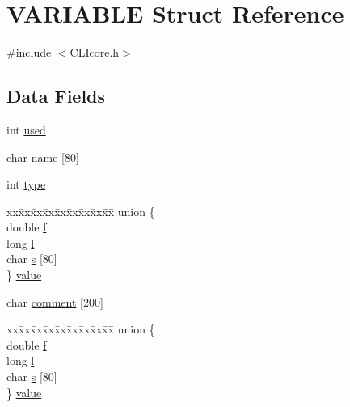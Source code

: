 \hypertarget{structVARIABLE}{\section{V\+A\+R\+I\+A\+B\+L\+E Struct Reference}
\label{structVARIABLE}
}


{\ttfamily \#include $<$C\+L\+Icore.\+h$>$}

\subsection*{Data Fields}
\begin{DoxyCompactItemize}
\item 
int \hyperlink{structVARIABLE_a33fcb1d4034cdf238453dc4ac3f17290}{used}
\item 
char \hyperlink{structVARIABLE_af69f0065f9aa9b7d4769e77d625fe214}{name} \mbox{[}80\mbox{]}
\item 
int \hyperlink{structVARIABLE_a84814331e54156c3ac9fbe6d2b851daf}{type}
\item 
\begin{tabbing}
xx\=xx\=xx\=xx\=xx\=xx\=xx\=xx\=xx\=\kill
union \{\\
\>double \hyperlink{structVARIABLE_af31bb248155770bb6d7080aa50bdb4fd}{f}\\
\>long \hyperlink{structVARIABLE_ab47a102e3cd7c7085641ffc056c41878}{l}\\
\>char \hyperlink{structVARIABLE_a63e49f4cf699d62212a55d257d0d87f7}{s} \mbox{[}80\mbox{]}\\
\} \hyperlink{structVARIABLE_ac78c074d5d0c437357a205d97ee58c70}{value}\\

\end{tabbing}\item 
char \hyperlink{structVARIABLE_a23f60960f41491ffdd8db54a0a606657}{comment} \mbox{[}200\mbox{]}
\item 
\begin{tabbing}
xx\=xx\=xx\=xx\=xx\=xx\=xx\=xx\=xx\=\kill
union \{\\
\>double \hyperlink{structVARIABLE_af31bb248155770bb6d7080aa50bdb4fd}{f}\\
\>long \hyperlink{structVARIABLE_ab47a102e3cd7c7085641ffc056c41878}{l}\\
\>char \hyperlink{structVARIABLE_a63e49f4cf699d62212a55d257d0d87f7}{s} \mbox{[}80\mbox{]}\\
\} \hyperlink{structVARIABLE_a5928e86d82f206db6dcef64844e7756a}{value}\\

\end{tabbing}\end{DoxyCompactItemize}


